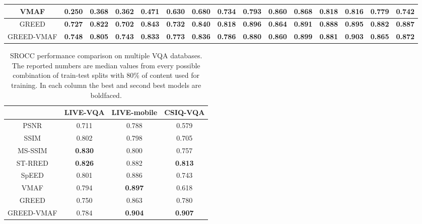 \documentclass[conference]{IEEEtran}
\begin{document}
\begin{table*}[t]
{\begin{tabular}{|c||c|c|c|c|c|c|c|c|c|c|c|c|c|c|}
			VMAF \cite{VMAF2016} & 0.250 & 0.368 & 0.362 & 0.471 & 0.630 & 0.680 & 0.734 & 0.793 & \textbf{0.860} & 0.868 & 0.818 & 0.816 & 0.779 & 0.742\\  \hline
			GREED & \textbf{0.727} & \textbf{0.822} & \textbf{0.702} & \textbf{0.843} & \textbf{0.732} & \textbf{0.840} & \textbf{0.818} & \textbf{0.896} & \textbf{0.864} & \textbf{0.891} & \textbf{0.888} & \textbf{0.895} & \textbf{0.882} & \textbf{0.887}\\
			GREED-VMAF & \textbf{0.748} & \textbf{0.805} & \textbf{0.743} & \textbf{0.833} & \textbf{0.773} & \textbf{0.836} & \textbf{0.786} & \textbf{0.880} & \textbf{0.860} & \textbf{0.899} & \textbf{0.881} & \textbf{0.903} & \textbf{0.865} & \textbf{0.872}\\
			\hline
		\end{tabular}
	}
\end{table*}

\begin{table}[t]
\caption{SROCC performance comparison on multiple VQA databases. The reported numbers are median values from every possible combination of train-test splits with 80\% of content used for training. In each column the best and second best models are boldfaced. }
    \label{Table:VQA_database}
    \centering
    \footnotesize
    \begin{tabular}{|c||c|c|c|}
        \hline
        ~    & LIVE-VQA  & LIVE-mobile & CSIQ-VQA \\ \hline \hline 
        PSNR & 0.711 & 0.788 & 0.579 \\ 
        SSIM \cite{wang2004image} & 0.802 & 0.798 & 0.705 \\ 
        MS-SSIM \cite{wang2003multiscale} & \textbf{0.830} & 0.800 & 0.757 \\
        ST-RRED \cite{soundararajan2012video} & \textbf{0.826} & 0.882 & \textbf{0.813} \\ 
        SpEED \cite{bampis2017speed} & 0.801 & 0.886 & 0.743 \\ 
        VMAF \cite{VMAF2016}& 0.794 & \textbf{0.897} & 0.618 \\ \hline
        GREED & 0.750 & 0.863 & 0.780 \\
        GREED-VMAF & 0.784 & \textbf{0.904} & \textbf{0.907} \\
        \hline
    \end{tabular}
\end{table}
\end{document}
